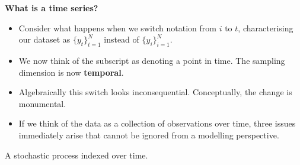 \documentclass[
  letterpaper,
  DIV=11,
  numbers=noendperiod]{scrartcl}
\newcommand{\slidelabel}[1]{{\color{embernavy}\bfseries\large #1\par\vspace{5pt}}}
\newenvironment{slidefooter}{%
  \par\vspace{7pt}{\color{emberrule}\rule{\linewidth}{0.4pt}}\par\vspace{4pt}%
  \color{emberamber}\itshape\small}{\par}
\begin{document}
\begin{slidebox}

\slidelabel{What is a time series?}

\begin{itemize}
\item
  Consider what happens when we switch notation from \(i\) to \(t\),
  characterising our dataset as \(\{y_t\}_{t=1}^{N}\) instead of
  \(\{y_i\}_{i=1}^{N}\).
\item
  We now think of the subscript as denoting a point in time. The
  sampling dimension is now \textbf{temporal}.
\item
  Algebraically this switch looks inconsequential. Conceptually, the
  change is monumental.
\item
  If we think of the data as a collection of observations over time,
  three issues immediately arise that cannot be ignored from a modelling
  perspective.
\end{itemize}

\begin{slidefooter}

A stochastic process indexed over time.

\end{slidefooter}

\end{slidebox}
\end{document}
